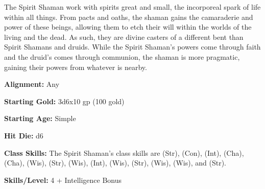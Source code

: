 
The Spirit Shaman work with spirits great and small, the incorporeal spark of life within all things. From pacts and oaths, the shaman gains the camaraderie and power of these beings, allowing them to etch their will within the worlds of the living and the dead. As such, they are divine casters of a different bent than Spirit Shamans and druids. While the Spirit Shaman's powers come through faith and the druid's comes through communion, the shaman is more pragmatic, gaining their powers from whatever is nearby.

\textbf{Alignment:} Any

\textbf{Starting Gold:} 3d6x10 gp (100 gold)

\textbf{Starting Age:} Simple

\textbf{Hit Die:} d6

\textbf{Class Skills:} The Spirit Shaman's class skills are  (Str),  (Con),  (Int),  (Cha),  (Cha),  (Wis),  (Str),  (Wis),  (Int),  (Wis),  (Str),  (Wis),  (Wis), and  (Str).

\textbf{Skills/Level:} 4 + Intelligence Bonus

\poorbab{}
\poorfor{}
\poorref{}
\goodwil{}


